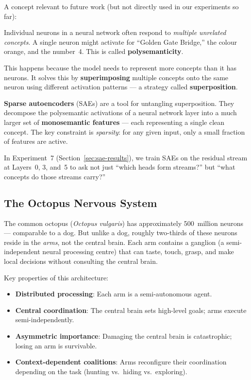 \documentclass[11pt,a4paper]{article}
\begin{document}
A concept relevant to future work (but not directly used in our experiments so far):

Individual neurons in a neural network often respond to \emph{multiple unrelated concepts}.
A single neuron might activate for ``Golden Gate Bridge,'' the colour orange, and the number~4.
This is called \textbf{polysemanticity}.

This happens because the model needs to represent more concepts than it has neurons.
It solves this by \textbf{superimposing} multiple concepts onto the same neuron using different activation patterns --- a strategy called \textbf{superposition}.

\textbf{Sparse autoencoders} (SAEs) are a tool for untangling superposition.
They decompose the polysemantic activations of a neural network layer into a much larger set of \textbf{monosemantic features} --- each representing a single clean concept.
The key constraint is \emph{sparsity}: for any given input, only a small fraction of features are active.

In Experiment~7 (Section~\ref{sec:sae-results}), we train SAEs on the residual stream at Layers~0, 3, and~5 to ask not just ``which heads form streams?'' but ``what concepts do those streams carry?''

\subsection{The Octopus Nervous System}
\label{sec:octopus}

The common octopus (\emph{Octopus vulgaris}) has approximately 500~million neurons --- comparable to a dog.
But unlike a dog, roughly two-thirds of these neurons reside in the \emph{arms}, not the central brain.
Each arm contains a ganglion (a semi-independent neural processing centre) that can taste, touch, grasp, and make local decisions without consulting the central brain.

Key properties of this architecture:
\begin{itemize}[itemsep=2pt]
    \item \textbf{Distributed processing}: Each arm is a semi-autonomous agent.
    \item \textbf{Central coordination}: The central brain sets high-level goals; arms execute semi-independently.
    \item \textbf{Asymmetric importance}: Damaging the central brain is catastrophic; losing an arm is survivable.
    \item \textbf{Context-dependent coalitions}: Arms reconfigure their coordination depending on the task (hunting vs.\ hiding vs.\ exploring).
\end{itemize}
\end{document}
